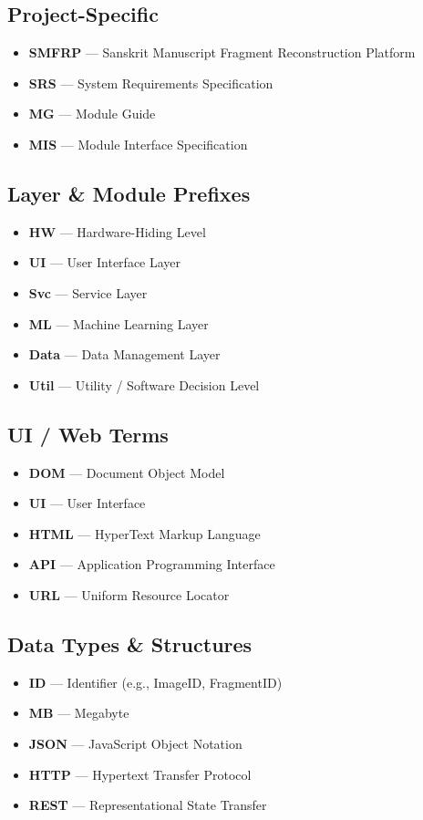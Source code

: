 \documentclass[12pt, titlepage]{article}
\begin{document}
\subsection*{Project-Specific}
\begin{itemize}
    \item \textbf{SMFRP} — Sanskrit Manuscript Fragment Reconstruction Platform
    \item \textbf{SRS} — System Requirements Specification
    \item \textbf{MG} — Module Guide
    \item \textbf{MIS} — Module Interface Specification
\end{itemize}

\subsection*{Layer \& Module Prefixes}
\begin{itemize}
    \item \textbf{HW} — Hardware-Hiding Level
    \item \textbf{UI} — User Interface Layer
    \item \textbf{Svc} — Service Layer
    \item \textbf{ML} — Machine Learning Layer
    \item \textbf{Data} — Data Management Layer
    \item \textbf{Util} — Utility / Software Decision Level
\end{itemize}

\subsection*{UI / Web Terms}
\begin{itemize}
    \item \textbf{DOM} — Document Object Model
    \item \textbf{UI} — User Interface
    \item \textbf{HTML} — HyperText Markup Language
    \item \textbf{API} — Application Programming Interface
    \item \textbf{URL} — Uniform Resource Locator
\end{itemize}

\subsection*{Data Types \& Structures}
\begin{itemize}
    \item \textbf{ID} — Identifier (e.g., ImageID, FragmentID)
    \item \textbf{MB} — Megabyte
    \item \textbf{JSON} — JavaScript Object Notation
    \item \textbf{HTTP} — Hypertext Transfer Protocol
    \item \textbf{REST} — Representational State Transfer
\end{itemize}
\end{document}
